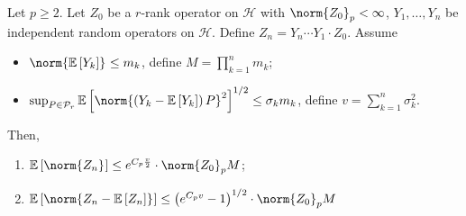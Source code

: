 \begin{thm}
    Let \( p \geq 2 \). Let \( Z_0 \) be a \( r \)-rank operator on \( \mathcal{H} \) with \( \norm{Z_0}_{p}< \infty \), \( Y_1,\dots,Y_n \) be independent random operators on \( \mathcal{H} \). Define \(Z_n=Y_n \cdots Y_1 \cdot Z_0\). Assume 
    \begin{itemize}
      \item \( \norm{\mathbb{E}\left[Y_k\right]}_{} \leq m_k \), define \( M=\prod_{k=1}^{n}m_k \);
      \item \( \sup_{P \in \mathcal{P}_r} \mathbb{E}\left[ \norm{\left(Y_k-\mathbb{E}\left[Y_k\right]\right)P}_{}^{2}\right]^{1/2} \leq  \sigma_km_k\), define \( v= \sum_{k=1}^{n}\sigma_k^{2} \).
    \end{itemize}
    Then,
    \begin{enumerate}[1)]
      \item \( \mathbb{E}\left[\norm{Z_n}_{}\right] \leq e^{C_p \frac{v}{2}} \cdot \norm{Z_0}_{p} M \);
      \item \( \mathbb{E}\left[\norm{Z_n-\mathbb{E}\left[Z_n\right]}_{}\right] \leq \left(e^{C_pv}-1\right)^{1/2} \cdot \norm{Z_0}_{p}M \)
    \end{enumerate}
    
\end{thm}

